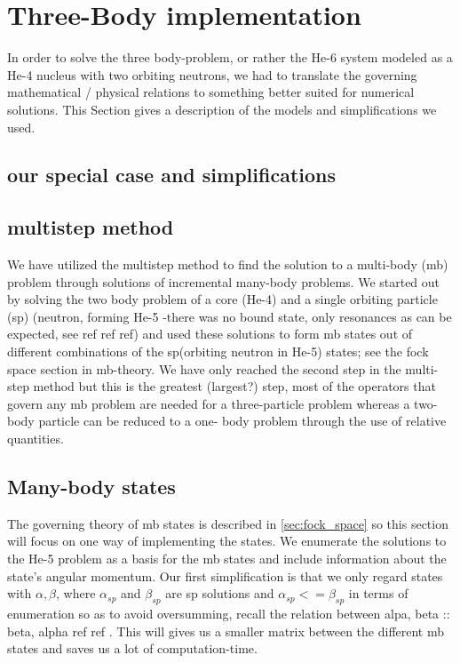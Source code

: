 \documentclass[12pt,a4paper]{article}
\begin{document}
\section{Three-Body implementation}
In order to solve the three body-problem, or rather the He-6 system modeled as a He-4 nucleus with two orbiting neutrons, we had to translate the governing mathematical / physical relations to something better suited for numerical solutions.
 This Section gives a description of the models and simplifications we used.

\subsection{our special case and simplifications}
\subsection{multistep method}
We have utilized the multistep method to find the solution to a multi-body (mb) problem through solutions of incremental many-body problems.
 We started out by solving the two body problem of a core (He-4) and a single orbiting particle (sp) (neutron, forming He-5 -there was no bound state, only resonances as can be expected, see ref ref ref) and used these solutions to form mb states out of different combinations of the sp(orbiting neutron in He-5) states; see the fock space section in mb-theory.
 We have only reached the second step in the multi-step method but this is the greatest (largest?) step, most of the operators that govern any mb problem are needed for a three-particle problem whereas a two-body particle can be reduced to a one- body problem through the use of relative quantities.
 
\subsection{Many-body states}
The governing theory of mb states is described in \ref{sec:fock_space} so this section will focus on one way of implementing the states. 
We enumerate the solutions to the He-5 problem as a basis for the mb states and include information about the state's angular momentum.
Our first simplification is that we only regard states with $\alpha, \beta$, where $\alpha_{sp}$ and $\beta_{sp} $ are sp solutions and $\alpha_{sp} <= \beta_{sp}$ in terms of enumeration so as to avoid oversumming, recall the relation between alpa, beta :: beta, alpha ref ref . 
This will gives us a smaller matrix between the different mb states and saves us a lot of computation-time.
\end{document}
